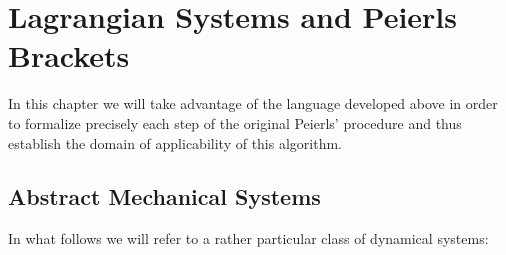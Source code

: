 \documentclass[Main]{subfiles}
\begin{document}
\chapter{Lagrangian Systems and Peierls Brackets}
In this chapter we will take advantage of the language developed above in order to  formalize precisely each step of the original Peierls' procedure\cite{Peierls1952} and thus establish the domain of applicability of this algorithm. 
  
	\section{Abstract Mechanical Systems}
	In what follows we will refer to a rather particular class of dynamical systems:
	
\end{document}
